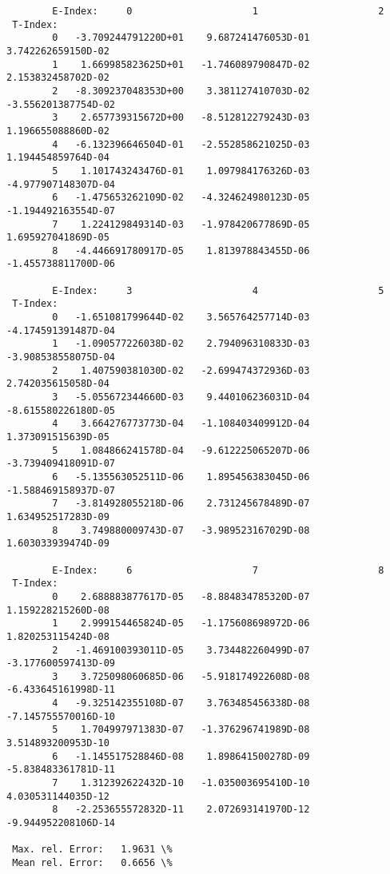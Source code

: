 \documentclass[12pt,dvipdfmx]{article}
\begin{document}
{\begin{small}\begin{verbatim}
        E-Index:     0                     1                     2
 T-Index:
        0   -3.709244791220D+01    9.687241476053D-01    3.742262659150D-02
        1    1.669985823625D+01   -1.746089790847D-02    2.153832458702D-02
        2   -8.309237048353D+00    3.381127410703D-02   -3.556201387754D-02
        3    2.657739315672D+00   -8.512812279243D-03    1.196655088860D-02
        4   -6.132396646504D-01   -2.552858621025D-03    1.194454859764D-04
        5    1.101743243476D-01    1.097984176326D-03   -4.977907148307D-04
        6   -1.475653262109D-02   -4.324624980123D-05   -1.194492163554D-07
        7    1.224129849314D-03   -1.978420677869D-05    1.695927041869D-05
        8   -4.446691780917D-05    1.813978843455D-06   -1.455738811700D-06

        E-Index:     3                     4                     5
 T-Index:
        0   -1.651081799644D-02    3.565764257714D-03   -4.174591391487D-04
        1   -1.090577226038D-02    2.794096310833D-03   -3.908538558075D-04
        2    1.407590381030D-02   -2.699474372936D-03    2.742035615058D-04
        3   -5.055672344660D-03    9.440106236031D-04   -8.615580226180D-05
        4    3.664276773773D-04   -1.108403409912D-04    1.373091515639D-05
        5    1.084866241578D-04   -9.612225065207D-06   -3.739409418091D-07
        6   -5.135563052511D-06    1.895456383045D-06   -1.588469158937D-07
        7   -3.814928055218D-06    2.731245678489D-07    1.634952517283D-09
        8    3.749880009743D-07   -3.989523167029D-08    1.603033939474D-09

        E-Index:     6                     7                     8
 T-Index:
        0    2.688883877617D-05   -8.884834785320D-07    1.159228215260D-08
        1    2.999154465824D-05   -1.175608698972D-06    1.820253115424D-08
        2   -1.469100393011D-05    3.734482260499D-07   -3.177600597413D-09
        3    3.725098060685D-06   -5.918174922608D-08   -6.433645161998D-11
        4   -9.325142355108D-07    3.763485456338D-08   -7.145755570016D-10
        5    1.704997971383D-07   -1.376296741989D-08    3.514893200953D-10
        6   -1.145517528846D-08    1.898641500278D-09   -5.838483361781D-11
        7    1.312392622432D-10   -1.035003695410D-10    4.030531144035D-12
        8   -2.253655572832D-11    2.072693141970D-12   -9.944952208106D-14

 Max. rel. Error:   1.9631 \%
 Mean rel. Error:   0.6656 \%



\end{verbatim}
\end{small}}
\end{document}
